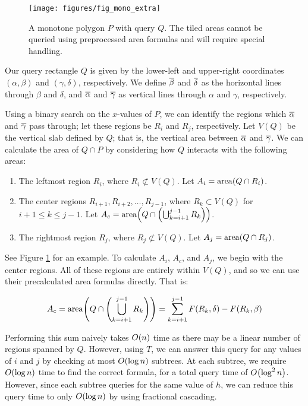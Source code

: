 \begin{figure}[t]
\begin{center}
  \texttt{[image: figures/fig\_mono\_extra]}
  \caption[Details of a query on a monotone polygon.]{A monotone polygon $P$ with query $Q$. The tiled areas cannot be queried using preprocessed area formulas and will require special handling.}
  \label{fig:monotonep:extra}
\end{center}
\end{figure}

Our query rectangle $Q$ is given by the lower-left and upper-right coordinates $(\alpha, \beta)$ and $(\gamma, \delta)$, respectively. We define $\overline{\beta}$ and $\overline{\delta}$ as the horizontal lines through $\beta$ and $\delta$, and $\overline{\alpha}$ and $\overline{\gamma}$ as vertical lines through $\alpha$ and $\gamma$, respectively.

Using a binary search on the $x$-values of $P$, we can identify the regions which $\overline{\alpha}$ and $\overline{\gamma}$ pass through; let these regions be $R_i$ and $R_j$, respectively.
Let $V(Q)$ be the vertical slab defined by $Q$; that is, the vertical area between $\overline{\alpha}$ and $\overline{\gamma}$.
We can calculate the area of $Q \cap P$ by considering how $Q$ interacts with the following areas:

\begin{enumerate}
 \item The leftmost region $R_i$, where $R_i \not \subset V(Q)$. Let $A_i = \operatorname{area}\!\left(Q \cap R_i\right)$.
 \item The center regions $R_{i+1}, R_{i+2}, \ldots, R_{j-1}$, where  $R_k \subset V(Q)$ for $i + 1 \leq k \leq j -1$. Let $A_c = \operatorname{area}\!\left(Q \cap \left ( \bigcup_{k=i+1}^{j-1}{R_k} \right )\right)$.
 \item The rightmost region $R_j$, where $R_j \not \subset V(Q)$. Let $A_j = \operatorname{area}\!\left(Q \cap R_j\right)$.
\end{enumerate}

See Figure \ref{fig:monotonep:extra} for an example. To calculate $A_i$, $A_c$, and $A_j$, we begin with the center regions. All of these regions are entirely within $V(Q)$, and so we can use their precalculated area formulas directly. That is:

\[
A_c
= \operatorname{area}\!\left(Q \cap \left ( \bigcup_{k=i+1}^{j-1}{R_k} \right )\right)
= \sum_{k=i+1}^{j-1} F(R_k, \delta) - F(R_k, \beta)
\]

\noindent Performing this sum naively takes $O\!\left(n\right)$ time as there may be a linear number of regions spanned by $Q$.
However, using $T$, we can answer this query for any values of $i$ and $j$ by checking at most $O\!\left(\log{n}\right)$ subtrees. 
At each subtree, we require $O\!\left(\log{n}\right)$ time to find the correct formula, for a total query time of $O\!\left(\log^2{n}\right)$.
However, since each subtree queries for the same value of $h$, we can reduce this query time to only $O\!\left(\log{n}\right)$ by using fractional cascading.\cite{cg-fc-86, cg-fc2-86}

